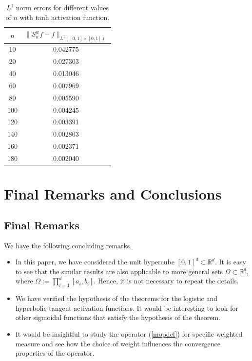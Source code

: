 \documentclass[12pt, reqno]{amsart}
\numberwithin{equation}{section}
\theoremstyle{definition}
\theoremstyle{remark}
\numberwithin{equation}{section}
\newcommand{\R}{\mathbb{R}}
\begin{document}
\begin{table}[H]
\centering
\begin{tabular}{|c| c|}
\hline
$n$ &  $\|S^w_nf-f\|_{L^1([0,1]\times[0,1])}$ \\
\hline
10 & 0.042775 \\
\hline
20 & 0.027303 \\
\hline
40 & 0.013046 \\
\hline
60 & 0.007969 \\
\hline
80 & 0.005590 \\
\hline
100 & 0.004245 \\
\hline
120 & 0.003391 \\
\hline
140 & 0.002803 \\
\hline
160 & 0.002371 \\
\hline
180 & 0.002040 \\
\hline
\end{tabular}
\caption{$L^1$ norm errors for different values of $n$ with tanh activation function.}
\label{t4}
\end{table}


\section{Final Remarks and Conclusions}
\subsection{Final Remarks} We have the following concluding remarks.
\begin{itemize}
    \item In this paper, we have considered the unit hypercube $[0,1]^d\subset \R^d$. It is easy to see that the similar results are also applicable to more general sets $\Omega \subset \R^d$, where $\Omega:=\displaystyle\prod_{i=1}^{d}[a_i, b_i].$ Hence, it is not necessary to repeat the details.\\

   \item We have verified the hypothesis of the theorems for the logistic and hyperbolic tangent activation functions. It would be interesting to look for other sigmoidal functions that satisfy the hypothesis of the theorem. \\
   
  


    \item It would be insightful to study the operator (\ref{mopdef}) for specific weighted measure and see how the choice of weight influences the convergence properties of the operator.
    
   \end{itemize}
    
\end{document}
